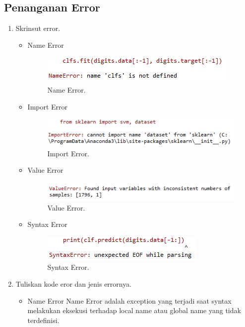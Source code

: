 \subsection{Penanganan Error}
\begin{enumerate}
	\item Skrinsut error.
	\begin{itemize}
		\item Name Error
		\hfill\break
		\begin{figure}[H]
			\includegraphics[width=8 cm]{figures/1174017/chapter1/error/err3.PNG}
			\centering
			\caption{Name Error.}
		\end{figure}
		\item Import Error
		\hfill\break
		\begin{figure}[H]
			\includegraphics[width=8 cm]{figures/1174017/chapter1/error/err1.PNG}
			\centering
			\caption{Import Error.}
		\end{figure}
		\item Value Error
		\hfill\break
		\begin{figure}[H]
			\includegraphics[width=8 cm]{figures/1174017/chapter1/error/err2.PNG}
			\centering
			\caption{Value Error.}
		\end{figure}
		\item Syntax Error
		\hfill\break
		\begin{figure}[H]
			\includegraphics[width=8 cm]{figures/1174017/chapter1/error/err4.PNG}
			\centering
			\caption{Syntax Error.}
		\end{figure}
	\end{itemize}
	\item Tuliskan kode eror dan jenis errornya.
	\begin{itemize}
		\item Name Error
		\hfill\break
		Name Error adalah exception yang terjadi saat syntax melakukan eksekusi terhadap local name atau global name yang tidak terdefinisi.

\end{itemize}
\end{enumerate}
